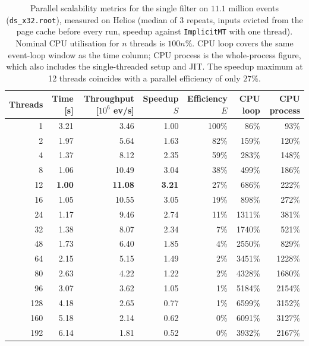 \begin{table}[htbp]
\centering
\caption{Parallel scalability metrics for the single filter on $11.1$ million events (\texttt{ds\_x32.root}), measured on Helios (median of 3 repeats, inputs evicted from the page cache before every run, speedup against \texttt{ImplicitMT} with one thread). Nominal CPU utilisation for $n$ threads is $100n\%$. CPU loop covers the same event-loop window as the time column; CPU process is the whole-process figure, which also includes the single-threaded setup and JIT. The speedup maximum at 12 threads coincides with a parallel efficiency of only $27\%$.}
\label{tab:scalability-filter}
\begin{tabular}{rrrrrrr}
\toprule
Threads & Time [s] & Throughput [$10^6$ ev/s] & Speedup $S$ & Efficiency $E$ & CPU loop & CPU process \\
\midrule
 1 & 3.21 & 3.46 & 1.00 & 100\% & 86\% & 93\% \\
 2 & 1.97 & 5.64 & 1.63 & 82\% & 159\% & 120\% \\
 4 & 1.37 & 8.12 & 2.35 & 59\% & 283\% & 148\% \\
 8 & 1.06 & 10.49 & 3.04 & 38\% & 499\% & 186\% \\
12 & \textbf{1.00} & \textbf{11.08} & \textbf{3.21} & 27\% & 686\% & 222\% \\
16 & 1.05 & 10.55 & 3.05 & 19\% & 898\% & 272\% \\
24 & 1.17 & 9.46 & 2.74 & 11\% & 1311\% & 381\% \\
32 & 1.38 & 8.07 & 2.34 & 7\% & 1740\% & 521\% \\
48 & 1.73 & 6.40 & 1.85 & 4\% & 2550\% & 829\% \\
64 & 2.15 & 5.15 & 1.49 & 2\% & 3451\% & 1228\% \\
80 & 2.63 & 4.22 & 1.22 & 2\% & 4328\% & 1680\% \\
96 & 3.07 & 3.62 & 1.05 & 1\% & 5184\% & 2154\% \\
128 & 4.18 & 2.65 & 0.77 & 1\% & 6599\% & 3152\% \\
160 & 5.18 & 2.14 & 0.62 & 0\% & 6091\% & 3127\% \\
192 & 6.14 & 1.81 & 0.52 & 0\% & 3932\% & 2167\% \\
\bottomrule
\end{tabular}
\end{table}
